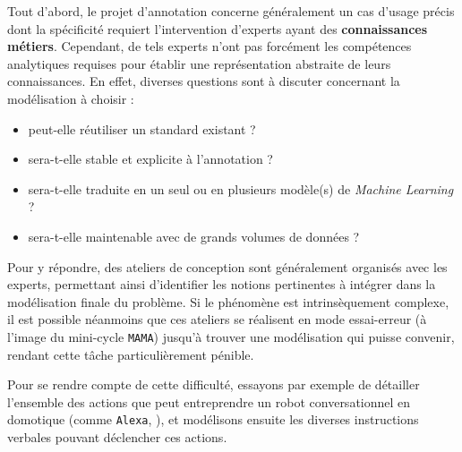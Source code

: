 			Tout d'abord, le projet d'annotation concerne généralement un cas d'usage précis dont la spécificité requiert l'intervention d'experts ayant des \textbf{connaissances métiers}.
			Cependant, de tels experts n'ont pas forcément les compétences analytiques requises pour établir une représentation abstraite de leurs connaissances.
			En effet, diverses questions sont à discuter concernant la modélisation à choisir :
			\begin{itemize}
				\item peut-elle réutiliser un standard existant ?
				\item sera-t-elle stable et explicite à l'annotation ?
				\item sera-t-elle traduite en un seul ou en plusieurs modèle(s) de \textit{Machine Learning} ?
				\item sera-t-elle maintenable avec de grands volumes de données ?
			\end{itemize}
			Pour y répondre, des ateliers de conception sont généralement organisés avec les experts, permettant ainsi d'identifier les notions pertinentes à intégrer dans la modélisation finale du problème.
			Si le phénomène est intrinsèquement complexe, il est possible néanmoins que ces ateliers se réalisent en mode essai-erreur (à l'image du mini-cycle \texttt{MAMA}) jusqu'à trouver une modélisation qui puisse convenir, rendant cette tâche particulièrement pénible.
			\begin{leftBarExamples}
				Pour se rendre compte de cette difficulté, essayons par exemple de détailler l'ensemble des actions que peut entreprendre un robot conversationnel en domotique (comme \texttt{Alexa}, \cite{alexa-internet:2018:keyword-research-competitor}), et modélisons ensuite les diverses instructions verbales pouvant déclencher ces actions.
			\end{leftBarExamples}
			
